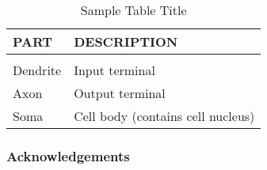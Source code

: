\documentclass[twoside]{article}
\theoremstyle{definition}
\begin{document}
\begin{table}[h]
\caption{Sample Table Title} \label{sample-table}
\begin{center}
\begin{tabular}{ll}
{\bf PART}  &{\bf DESCRIPTION} \\
\hline \\
Dendrite         &Input terminal \\
Axon             &Output terminal \\
Soma             &Cell body (contains cell nucleus) \\
\end{tabular}
\end{center}
\end{table}
\fi

\subsubsection*{Acknowledgements}





\newpage

\end{document}
